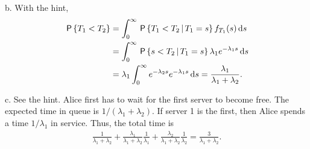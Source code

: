 \begin{exercise}
\begin{solution}
b. With the hint,
\begin{align*}
\,\mathsf{P}\left\{T_1<T_2\right\}
&= \int_0^{\infty} \,\mathsf{P}\left\{T_1< T_2\,\middle|\, T_1=s\right\} f_{T_1}(s)\,\textrm{d}s \\
&= \int_0^{\infty} \,\mathsf{P}\left\{s< T_2\,\middle|\, T_1=s\right\} \lambda_1e^{-\lambda_1 s} \,\textrm{d}s \\
&= \lambda_{1} \int_0^{\infty} e^{-\lambda_{2} s} e^{-\lambda_1 s} \,\textrm{d}s = \frac{\lambda_1}{\lambda_1+\lambda_2}.
\end{align*}

c. See the hint. Alice first has to wait for the first server to become free. The expected time in queue is $1/(\lambda_1+\lambda_2)$. If server 1 is the first, then Alice spends a  time $1/\lambda_1$ in service. Thus, the total time is
\begin{align*}
  \frac{1}{\lambda_1+\lambda_2} +
  \frac{\lambda_1}{\lambda_1+\lambda_2} \frac{1}{\lambda_{1}} +
  \frac{\lambda_2}{\lambda_1+\lambda_2} \frac{1}{\lambda_{2}}  =
\frac{3}{\lambda_1+\lambda_{2}}.
\end{align*}
\end{solution}
\end{exercise}

